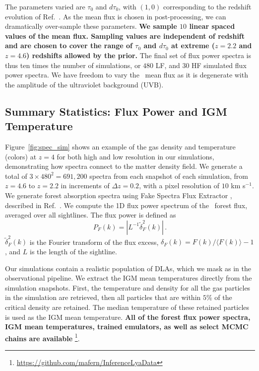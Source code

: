 The parameters varied are $\tau_0$ and $d\tau_0$, with $(1, 0)$ corresponding to the redshift evolution of Ref.~\cite{2007MNRAS.382.1657K}.
As the mean flux is chosen in post-processing, we can dramatically over-sample these parameters. \textbf{We sample $10$ linear spaced values of the mean flux. Sampling values are independent of redshift and are chosen to cover the range of $\tau_0$ and $d\tau_0$ at extreme ($z=2.2$ and $z=4.6$) redshifts allowed by the prior.}
The final set of flux power spectra is thus ten times the number of simulations, or $480$ LF, and $30$ HF simulated flux power spectra.
We have freedom to vary the \Lya~mean flux as it is degenerate with the amplitude of the ultraviolet background (UVB). 


\subsection{Summary Statistics: Flux Power and IGM Temperature}\label{sec:sim_fps}

Figure~\ref{fig:spec_sim} shows an example of the gas density and temperature (colors) at $z=4$ for both high and low resolution in our simulations, demonstrating how spectra connect to the matter density field.
We generate a total of $3\times 480^2 = 691,200$ spectra from each snapshot of each simulation, from $z=4.6$ to $z=2.2$ in increments of $\Delta z=0.2$, with a pixel resolution of $10$ km s$^{-1}$.
We generate \lya forest absorption spectra using Fake Spectra Flux Extractor \cite{2017ascl.soft10012B}\footnotemark, described in Ref.~\cite{2015MNRAS.447.1834B}.
We compute the 1D flux power spectrum of the \Lya~forest flux, averaged over all sightlines.
The flux power is defined as 
\begin{equation}
 P_F(k) = |L^{-1}\tilde{\delta}^2_F(k)|\,.   
\end{equation}
$\tilde{\delta}^2_F(k)$ is the Fourier transform of the flux excess, $\delta_F(k) = F(k)/\langle F(k) \rangle - 1$, and $L$ is the length of the sightline. 

Our simulations contain a realistic population of DLAs, which we mask as in the observational pipeline.
We extract the IGM mean temperatures directly from the simulation snapshots.
First, the temperature and density for all the gas particles in the simulation are retrieved, then all particles that are within $5\%$ of the critical density are retained.
The median temperature of these retained particles is used as the IGM mean temperature.
\textbf{All of the \lya forest flux power spectra, IGM mean temperatures, trained emulators, as well as select MCMC chains are available} \footnote{\url{https://github.com/mafern/InferenceLyaData}}.

